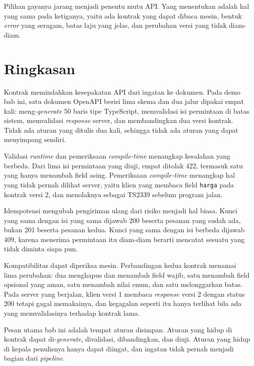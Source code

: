 Pilihan gayanya jarang menjadi penentu mutu API. Yang menentukan adalah hal
yang sama pada ketiganya, yaitu ada kontrak yang dapat dibaca mesin, bentuk
\textit{error} yang seragam, batas laju yang jelas, dan perubahan versi yang
tidak diam-diam.

\section{Ringkasan}

Kontrak memindahkan kesepakatan API dari ingatan ke dokumen. Pada demo bab
ini, satu dokumen OpenAPI berisi lima skema dan dua jalur dipakai empat kali:
meng-\textit{generate} 50 baris tipe TypeScript, memvalidasi isi permintaan
di batas sistem, memvalidasi \textit{response} server, dan membandingkan dua versi
kontrak. Tidak ada aturan yang ditulis dua kali, sehingga tidak ada aturan
yang dapat menyimpang sendiri.

Validasi \textit{runtime} dan pemeriksaan \textit{compile-time} menangkap
kesalahan yang berbeda. Dari lima isi permintaan yang diuji, empat ditolak
422, termasuk satu yang hanya menambah field asing. Pemeriksaan
\textit{compile-time} menangkap hal yang tidak pernah dilihat server, yaitu
klien yang membaca field \texttt{harga} pada kontrak versi 2, dan menolaknya
sebagai TS2339 sebelum program jalan.

Idempotensi mengubah pengiriman ulang dari risiko menjadi hal biasa. Kunci
yang sama dengan isi yang sama dijawab 200 beserta pesanan yang sudah ada,
bukan 201 beserta pesanan kedua. Kunci yang sama dengan isi berbeda dijawab
409, karena menerima permintaan itu diam-diam berarti mencatat sesuatu yang
tidak diminta siapa pun.

Kompatibilitas dapat diperiksa mesin. Perbandingan kedua kontrak menamai lima
perubahan: dua menghapus dan menambah field wajib, satu menambah field
opsional yang aman, satu menambah nilai enum, dan satu melonggarkan batas.
Pada server yang berjalan, klien versi 1 membaca \textit{response} versi 2 dengan
status 200 tetapi gagal memakainya, dan kegagalan seperti itu hanya terlihat
bila ada yang memvalidasinya terhadap kontrak lama.

Pesan utama bab ini adalah tempat aturan disimpan. Aturan yang hidup di
kontrak dapat di-\textit{generate}, divalidasi, dibandingkan, dan diuji.
Aturan yang hidup di kepala penulisnya hanya dapat diingat, dan ingatan tidak
pernah menjadi bagian dari \textit{pipeline}.
